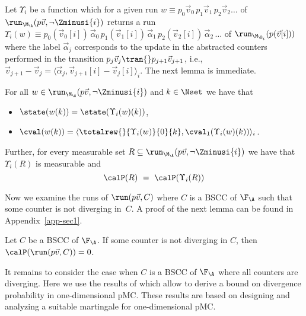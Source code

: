 Let $\Upsilon_i$ be a function which for a given run 
$w \equiv p_0\vec{v}_0\,p_1\vec{v}_1\, p_2\vec{v}_2\ldots$ of
$\run_{\M_\A}(p\vec{v},\neg\Zminusi{i})$ returns a run
$\Upsilon_i(w) \equiv p_0(\vec{v}_0[i]) \, \vec{\alpha}_0 \, 
p_1(\vec{v}_1[i]) \, \vec{\alpha}_1 \, p_2(\vec{v}_2[i]) \, \vec{\alpha}_2 \, \ldots$
of $\run_{\M_{\B_i}}(p(\vec{v}[i]))$ where the label $\vec{\alpha}_j$ 
corresponds to the update in the abstracted counters performed in
the transition $p_j\vec{v}_j \tran{} p_{j+1}\vec{v}_{j+1}$,
i.e., $\vec{v}_{j+1} - \vec{v}_j = 
\langle \vec{\alpha}_j,\vec{v}_{j+1}[i] - \vec{v}_j[i] \rangle_i$. 
The next lemma is immediate.
\begin{lemma}\label{prop:one-counter-runs}
For all $w \in \run_{\M_\A}(p\vec{v},\neg\Zminusi{i})$ and 
$k \in \Nset$ we have that
\begin{itemize}
\item $\state(w(k))=\state(\Upsilon_i(w)(k))$,
\item $\cval(w(k)) = \langle \totalrew{}{\Upsilon_i(w)}{0}{k}, 
  \cval_1(\Upsilon_i(w)(k))\rangle_i$.
\end{itemize}
Further, for every measurable set 
$R\subseteq \run_{\M_\A}(p\vec{v},\neg\Zminusi{i})$ we have that $\Upsilon_i(R)$ is measurable and
\begin{equation}
\calP(R) \ = \
  \calP(\Upsilon_i(R)) 
\label{eq-project}
\end{equation}\end{lemma}

\noindent
Now we examine the runs of $\run(p\vec{v},C)$ where $C$ is a BSCC of
$\F_\A$ such that some counter is not diverging in~$C$. A proof of
the next lemma can be found in Appendix~\ref{app-sec1}.

\begin{lemma}
\label{lem:not-diverging}
  Let $C$ be a BSCC of $\F_{\A}$.
  If some counter is not diverging in $C$, then $\calP(\run(p\vec{v},C)) = 0$.
\end{lemma}

It remains to consider the case when $C$ is a BSCC of $\F_{\A}$
where all counters are diverging. Here we use the results of
\cite{BKK:pOC-time-LTL-martingale} which allow to derive
a bound on divergence probability in one-dimensional pMC.
These results are based on designing and analyzing a suitable
martingale for one-dimensional pMC. 

